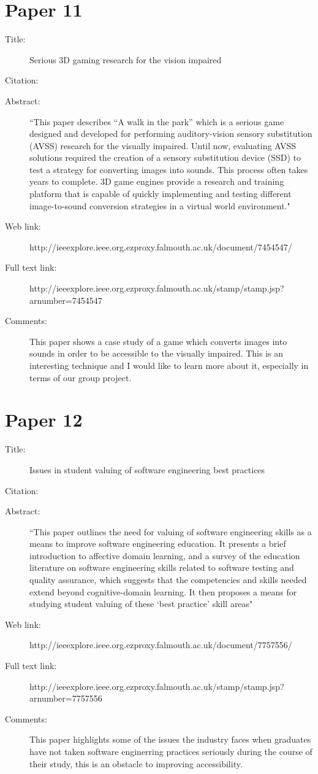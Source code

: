 \documentclass{scrartcl}
\begin{document}
\section*{Paper 11}
\begin{description}
\item[Title:] Serious 3D gaming research for the vision impaired
\item[Citation:] \cite{Marshall}
\item[Abstract:] ``This paper describes “A walk in the park” which is a serious game designed and developed for performing auditory-vision sensory substitution (AVSS) research for the visually impaired. Until now, evaluating AVSS solutions required the creation of a sensory substitution device (SSD) to test a strategy for converting images into sounds. This process often takes years to complete. 3D game engines provide a research and training platform that is capable of quickly implementing and testing different image-to-sound conversion strategies in a virtual world environment."
\item[Web link:] http://ieeexplore.ieee.org.ezproxy.falmouth.ac.uk/document/7454547/
\item[Full text link:] http://ieeexplore.ieee.org.ezproxy.falmouth.ac.uk/stamp/stamp.jsp?arnumber=7454547
\item[Comments:] This paper shows a case study of a game which converts images into sounds in order to be accessible to the visually impaired. This is an interesting technique and I would like to learn more about it, especially in terms of our group project.
\end{description}

\section*{Paper 12}
\begin{description}
\item[Title:] Issues in student valuing of software engineering best practices
\item[Citation:] \cite{Frezza}
\item[Abstract:] ``This paper outlines the need for valuing of software engineering skills as a means to improve software engineering education. It presents a brief introduction to affective domain learning, and a survey of the education literature on software engineering skills related to software testing and quality assurance, which suggests that the competencies and skills needed extend beyond cognitive-domain learning. It then proposes a means for studying student valuing of these `best practice' skill areas"
\item[Web link:] http://ieeexplore.ieee.org.ezproxy.falmouth.ac.uk/document/7757556/
\item[Full text link:] http://ieeexplore.ieee.org.ezproxy.falmouth.ac.uk/stamp/stamp.jsp?arnumber=7757556
\item[Comments:] This paper highlights some of the issues the industry faces when graduates have not taken software enginerring practices seriously during the course of their study, this is an obstacle to improving accessibility.
\end{description}
\end{document}
